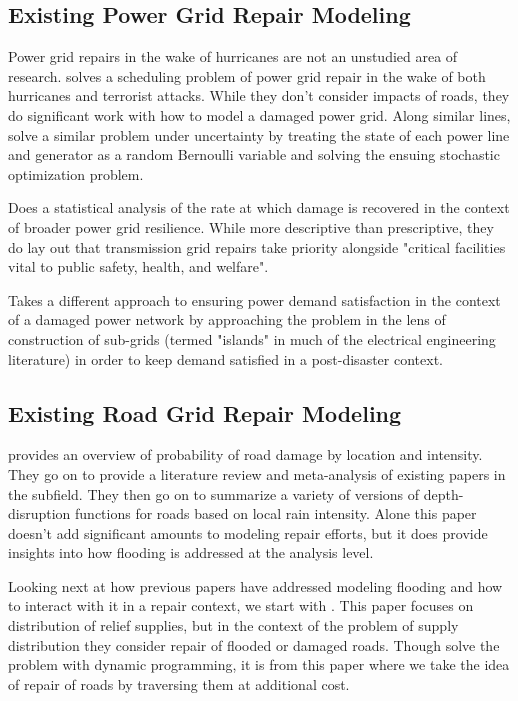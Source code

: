 \documentclass{article}
\begin{document}
	\subsection{Existing Power Grid Repair Modeling}
		Power grid repairs in the wake of hurricanes are not an unstudied area of research. \cite{NPSMasters} solves a scheduling problem of power grid repair in the wake of both hurricanes and terrorist attacks. While they don't consider impacts of roads, they do significant work with how to model a damaged power grid. Along similar lines, \cite{ArabEA2015} solve a similar problem under uncertainty by treating the state of each power line and generator as a random Bernoulli variable and solving the ensuing stochastic 
		optimization problem. 
		
		\cite{OuyangEA2014} Does a statistical analysis of the rate at which damage is recovered in the context of broader power grid resilience. While more descriptive than prescriptive, they do lay out that transmission grid repairs take priority alongside "critical facilities vital to public safety, health, and welfare".
		
		\cite{GolariEA2014} Takes a different approach to ensuring power demand satisfaction in the context of a damaged power network by approaching the problem in the lens of construction of sub-grids (termed "islands" in much of the electrical engineering literature) in order to keep demand satisfied in a post-disaster context.
	\subsection{Existing Road Grid Repair Modeling}
		\cite{PregnolatoEA2017} provides an overview of probability of road damage by location and intensity. They go on to provide a literature review and meta-analysis of existing papers in the subfield. They then go on to summarize a variety of versions of depth-disruption functions for roads based on local rain intensity. Alone this paper doesn't add significant amounts to modeling repair efforts, but it does provide insights into how flooding is addressed at the analysis level.
		
		Looking next at how previous papers have addressed modeling flooding and how to interact with it in a repair context, we start with \cite{DuqueEA2016}. This paper focuses on distribution of relief supplies, but in the context of the problem of supply distribution they consider repair of flooded or damaged roads. Though solve the problem with dynamic programming, it is from this paper where we take the idea of repair of roads by traversing them at additional cost.
		
\end{document}
